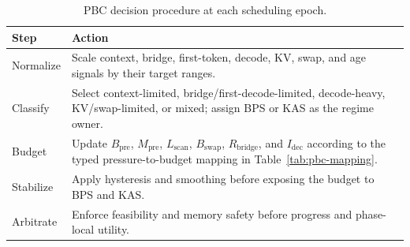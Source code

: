 \documentclass[lettersize,journal]{IEEEtran}
\begin{document}
\begin{table}[t]
\centering
\caption{PBC decision procedure at each scheduling epoch.}
\label{tab:pbc-procedure}
\scriptsize
\begin{tabular}{>{\raggedright\arraybackslash}p{}>{\raggedright\arraybackslash}p{}}
\hline
\textbf{Step} & \textbf{Action}\\
\hline
Normalize & Scale context, bridge, first-token, decode, KV, swap, and age signals by their target ranges.\\
Classify & Select context-limited, bridge/first-decode-limited, decode-heavy, KV/swap-limited, or mixed; assign BPS or KAS as the regime owner.\\
Budget & Update $B_{\mathrm{pre}}$, $M_{\mathrm{pre}}$, $L_{\mathrm{scan}}$, $B_{\mathrm{swap}}$, $R_{\mathrm{bridge}}$, and $I_{\mathrm{dec}}$ according to the typed pressure-to-budget mapping in Table~\ref{tab:pbc-mapping}.\\
Stabilize & Apply hysteresis and smoothing before exposing the budget to BPS and KAS.\\
Arbitrate & Enforce feasibility and memory safety before progress and phase-local utility.\\
\hline
\end{tabular}
\end{table}
\end{document}
